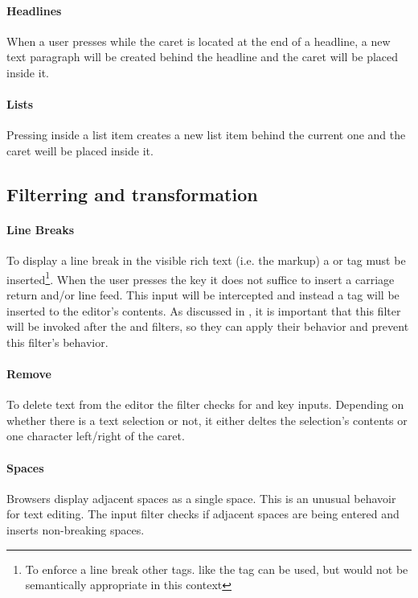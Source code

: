 \paragraph{Headlines} When a user presses  while the caret is located at the end of a headline, a new text paragraph will be created behind the headline and the caret will be placed inside it.

\paragraph{Lists} Pressing  inside a list item creates a new list item behind the current one and the caret weill be placed inside it.

\subsection{Filterring and transformation}

\paragraph{Line Breaks} To display a line break in the visible rich text (i.e. the markup) a  or  tag must be inserted\footnote{To enforce a line break other tags. like the  tag can be used, but would not be semantically appropriate in this context}. When the user presses the  key it does not suffice to insert a carriage return and/or line feed. This input will be intercepted and instead a  tag will be inserted to the editor's contents. As discussed in , it is important that this filter will be invoked after the  and  filters, so they can apply their behavior and prevent this filter's behavior.

\paragraph{Remove} To delete text from the editor the  filter checks for  and  key inputs. Depending on whether there is a text selection or not, it either deltes the selection's contents or one character left/right of the caret.

\paragraph{Spaces} Browsers display adjacent spaces as a single space. This is an unusual behavoir for text editing. The  input filter checks if adjacent spaces are being entered and inserts non-breaking spaces.

